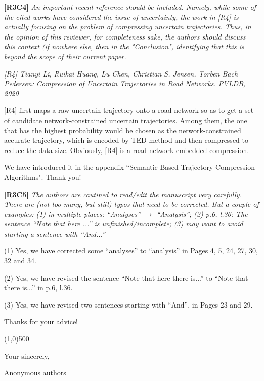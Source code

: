 \documentclass{letter}
\begin{document}
\textbf{[R3C4]} \emph{An important recent reference should be included. Namely, while some of the cited works have considered the issue of uncertainty, the work in [R4] is actually focusing on the problem of compressing uncertain trajectories. Thus, in the opinion of this reviewer, for completeness sake, the authors should discuss this context (if nowhere else, then in the "Conclusion", identifying that this is beyond the scope of their current paper. }

\emph{[R4] Tianyi Li, Ruikai Huang, Lu Chen, Christian S. Jensen, Torben Bach Pedersen:
	Compression of Uncertain Trajectories in Road Networks. PVLDB, 2020}

[R4] first maps a raw uncertain trajectory onto a road network so as to get a set of candidate network-constrained uncertain trajectories. Among them, the one that has the highest probability would be chosen
as the network-constrained accurate trajectory, which is encoded by TED method and then compressed to reduce the data size. Obviously, [R4] is a road network-embedded compression. 


We have introduced it in the appendix ``Semantic Based Trajectory Compression Algorithms". Thank you!


\textbf{[R3C5]} \emph{The authors are cautined to read/edit the manuscript very carefully. There are (not too many, but still) typos that need to be corrected. But a couple of examples:}
  \emph{(1) in multiple places: ``Analyses'' $\rightarrow$ ``Analysis'';}
  \emph{(2) p.6, l.36: The sentence ``Note that here ...'' is unfinished/incomplete;}
  \emph{(3) may want to avoid starting a sentence with ``And...''}


(1) Yes, we have corrected some ``analyses'' to ``analysis'' in Pages 4, 5, 24, 27, 30, 32 and 34.

(2) Yes, we have revised the sentence ``Note that here there is...'' to ``Note that there is...'' in p.6, l.36.

(3) Yes, we have revised two sentences starting with ``And'', in Pages 23 and 29.

Thanks for your advice!

\line(1,0){500}



Your sincerely,

Anonymous authors

%
%
\end{document}
